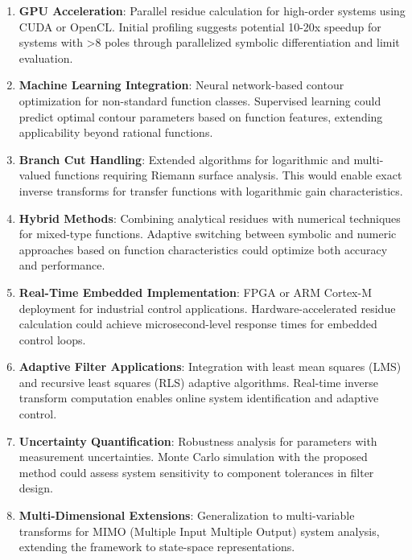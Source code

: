 \documentclass[conference]{IEEEtran}
\begin{document}
\begin{enumerate}
    \item \textbf{GPU Acceleration}: Parallel residue calculation for high-order systems using CUDA or OpenCL. Initial profiling suggests potential 10-20x speedup for systems with >8 poles through parallelized symbolic differentiation and limit evaluation.
    
    \item \textbf{Machine Learning Integration}: Neural network-based contour optimization for non-standard function classes. Supervised learning could predict optimal contour parameters based on function features, extending applicability beyond rational functions.
    
    \item \textbf{Branch Cut Handling}: Extended algorithms for logarithmic and multi-valued functions requiring Riemann surface analysis. This would enable exact inverse transforms for transfer functions with logarithmic gain characteristics.
    
    \item \textbf{Hybrid Methods}: Combining analytical residues with numerical techniques for mixed-type functions. Adaptive switching between symbolic and numeric approaches based on function characteristics could optimize both accuracy and performance.
    
    \item \textbf{Real-Time Embedded Implementation}: FPGA or ARM Cortex-M deployment for industrial control applications. Hardware-accelerated residue calculation could achieve microsecond-level response times for embedded control loops.
    
    \item \textbf{Adaptive Filter Applications}: Integration with least mean squares (LMS) and recursive least squares (RLS) adaptive algorithms. Real-time inverse transform computation enables online system identification and adaptive control.
    
    \item \textbf{Uncertainty Quantification}: Robustness analysis for parameters with measurement uncertainties. Monte Carlo simulation with the proposed method could assess system sensitivity to component tolerances in filter design.
    
    \item \textbf{Multi-Dimensional Extensions}: Generalization to multi-variable transforms for MIMO (Multiple Input Multiple Output) system analysis, extending the framework to state-space representations.
\end{enumerate}
\end{document}
